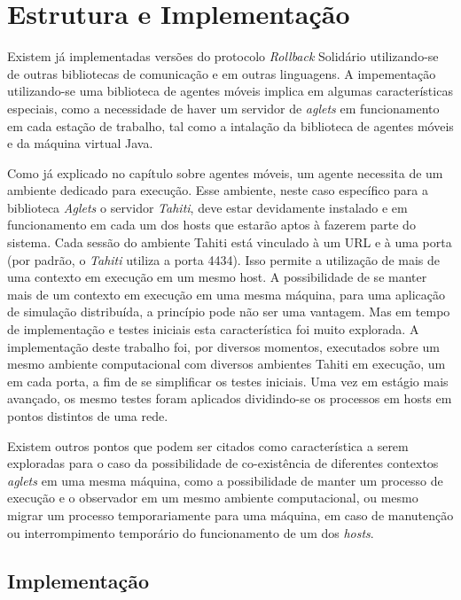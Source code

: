 \chapter{Estrutura e Implementação}

Existem já implementadas versões do protocolo \textit{Rollback} Solidário utilizando-se de outras bibliotecas de comunicação e em outras linguagens. A impementação utilizando-se uma biblioteca de agentes móveis implica em algumas características especiais, como a necessidade de haver um servidor de \textit{aglets} em funcionamento em cada estação de trabalho, tal como a intalação da biblioteca de agentes
móveis e da máquina virtual Java.

Como já explicado no capítulo sobre agentes móveis, um agente necessita de um ambiente dedicado para execução. Esse ambiente, neste caso específico para a biblioteca \textit{Aglets} o servidor \textit{Tahiti}, deve estar devidamente instalado e em funcionamento em cada um dos hosts que estarão aptos à fazerem parte do sistema. Cada sessão do ambiente Tahiti está vinculado à um URL e à uma porta (por padrão, o \textit{Tahiti} utiliza a porta 4434). Isso permite a utilização de mais de uma contexto em execução em um mesmo host. A possibilidade de se manter mais de um contexto em execução em uma mesma máquina, para uma aplicação de simulação distribuída, a princípio pode não ser uma vantagem. Mas em tempo de implementação e testes iniciais esta característica foi muito explorada. A implementação deste trabalho foi, por diversos momentos, executados sobre um mesmo ambiente computacional com diversos ambientes Tahiti em execução, um em cada porta, a fim de se simplificar os testes iniciais. Uma vez em estágio mais avançado, os mesmo testes foram aplicados dividindo-se os processos em hosts em pontos distintos de uma rede.

Existem outros pontos que podem ser citados como característica a serem exploradas para o caso da possibilidade de co-existência de diferentes contextos \textit{aglets} em uma mesma máquina, como a possibilidade de manter um processo de execução e o observador em um mesmo ambiente computacional, ou mesmo migrar um processo temporariamente para uma máquina, em caso de manutenção ou interrompimento temporário do funcionamento de um dos \textit{hosts}.

\section{Implementação}

